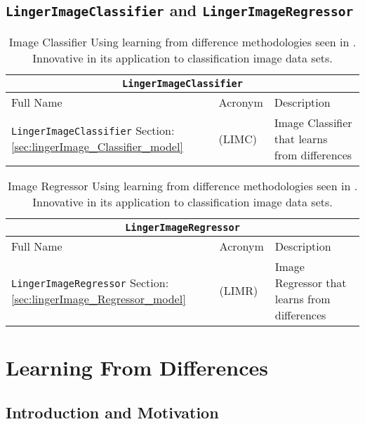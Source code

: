 \documentclass[a4paper, 12pt]{report}
\begin{document}
\subsection{\texttt{LingerImageClassifier} and \texttt{LingerImageRegressor}}
\begin{table}[H]
    \centering
    \begin{tabular}{ |p{6cm}|p{2cm}|p{9cm}| }
        \hline
        \multicolumn{3}{|c|}{\texttt{LingerImageClassifier}} \\
        \hline
        \hline
        Full Name & Acronym & Description \\
        \hline
        \texttt{LingerImageClassifier}  Section: \ref{sec:lingerImage_Classifier_model} & (LIMC) & Image Classifier that learns from differences \\
        \hline
    \end{tabular}
    \caption{Image Classifier Using learning from difference methodologies seen in \cite{learningFromDifferences2022}. Innovative in its application to classification image data sets.}
    \label{tab:LingerImageClassifier}
\end{table}

\begin{table}[H]
    \centering
    \begin{tabular}{ |p{6cm}|p{2cm}|p{9cm}| }
        \hline
        \multicolumn{3}{|c|}{\texttt{LingerImageRegressor}} \\
        \hline
        \hline
        Full Name & Acronym & Description \\
        \hline
        \texttt{LingerImageRegressor}  Section: \ref{sec:lingerImage_Regressor_model} & (LIMR) & Image Regressor that learns from differences \\
        \hline
    \end{tabular}
    \caption{Image Regressor Using learning from difference methodologies seen in \cite{learningFromDifferences2022}. Innovative in its application to classification image data sets.}
    \label{tab:LingerImageRegressor}
\end{table}

\section{Learning From Differences}
\subsection{Introduction and Motivation}
\end{document}
